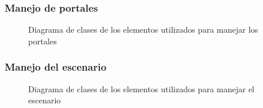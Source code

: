 \documentclass[a4paper]{article}
\begin{document}
\newpage
\subsubsection{Manejo de portales}

\begin{figure}[!h]
	\caption{Diagrama de clases de los elementos utilizados para manejar los portales}
	\label{fig:diagrama3}
\end{figure}


\subsubsection{Manejo del escenario}

\begin{figure}[!h]
	\caption{Diagrama de clases de los elementos utilizados para manejar el escenario}
	\label{fig:diagrama4}
\end{figure}
\end{document}
